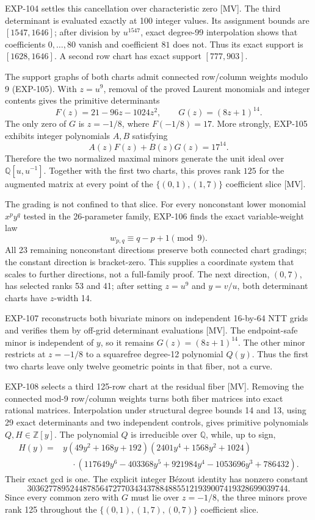 \documentclass[11pt]{article}
\theoremstyle{remark}
\begin{document}
EXP-104 settles this cancellation over characteristic zero [MV]. The third determinant
is evaluated exactly at 100 integer values. Its assignment bounds are
\([1547,1646]\); after division by \(u^{1547}\), exact degree-99 interpolation
shows that coefficients \(0,\ldots,80\) vanish and coefficient \(81\) does
not. Thus its exact support is \([1628,1646]\). A second row chart has exact
support \([777,903]\).

The support graphs of both charts admit connected row/column weights modulo
9 \mbox{(EXP-105)}. With \(z=u^9\), removal of the proved Laurent monomials and
integer contents gives the primitive determinants
\[
 F(z)=21-96z-1024z^2,\qquad G(z)=(8z+1)^{14}.
\]
The only zero of \(G\) is \(z=-1/8\), where \(F(-1/8)=17\). More strongly,
EXP-105 exhibits integer polynomials \(A,B\) satisfying
\[
 A(z)F(z)+B(z)G(z)=17^{14}.
\]
Therefore the two normalized maximal minors generate the unit ideal over
\(\mathbb{Q}[u,u^{-1}]\). Together with the first two charts, this proves
rank \(125\) for the augmented matrix at every point of the
\(\{(0,1),(1,7)\}\) coefficient slice [MV].

The grading is not confined to that slice. For every nonconstant lower
monomial \(x^py^q\) tested in the 26-parameter family, EXP-106
finds the exact variable-weight law
\[
 w_{p,q}\equiv q-p+1\pmod9.
\]
All 23 remaining nonconstant directions preserve both connected chart
gradings; the constant direction is bracket-zero. This supplies a coordinate
system that scales to further directions, not a full-family proof. The next
direction, \((0,7)\), has selected ranks 53 and 41; after setting
\(z=u^9\) and \(y=v/u\), both determinant charts have \(z\)-width 14.

EXP-107 reconstructs both bivariate minors on independent 16-by-64 NTT grids
and verifies them by off-grid determinant evaluations [MV]. The endpoint-safe
minor is independent of \(y\), so it remains \(G(z)=(8z+1)^{14}\). The other
minor restricts at \(z=-1/8\) to a squarefree degree-12 polynomial \(Q(y)\).
Thus the first two charts leave only twelve geometric points in that fiber,
not a curve.

EXP-108 selects a third 125-row chart at the residual fiber [MV]. Removing
the connected mod-9 row/column weights turns both fiber matrices into exact
rational matrices. Interpolation under structural degree bounds 14 and 13,
using 29 exact determinants and two independent controls, gives primitive
polynomials \(Q,H\in\mathbb Z[y]\). The polynomial \(Q\) is irreducible over
\(\mathbb Q\), while, up to sign,
\[
\begin{split}
H(y)={}&y(49y^2+168y+192)(2401y^4+1568y^2+1024)\\
&\quad\cdot(117649y^6-403368y^5+921984y^4
-1053696y^3+786432).
\end{split}
\]
Their exact gcd is one. The explicit integer B\'ezout identity has nonzero
constant
\[
3036277895244878564727703434378848855121939007419328699039744.
\]
Since every common zero with \(G\) must lie over \(z=-1/8\), the three minors
prove rank 125 throughout the
\(\{(0,1),(1,7),(0,7)\}\) coefficient slice.
\end{document}
